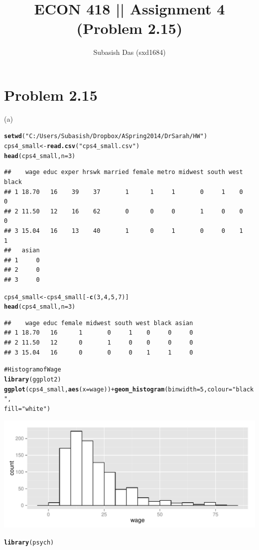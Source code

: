 \documentclass[a4paper]{article}\usepackage{graphicx, color}
\makeatletter
\def\maxwidth{ %
  \ifdim\Gin@nat@width>\linewidth
    \linewidth
  \else
    \Gin@nat@width
  \fi
}
\newcommand{\hlfunctioncall}[1]{\textcolor[rgb]{0.501960784313725,0,0.329411764705882}{\textbf{#1}}}%
\newcommand{\hlstring}[1]{\textcolor[rgb]{0.6,0.6,1}{#1}}%
\newcommand{\hlcomment}[1]{\textcolor[rgb]{0.180392156862745,0.6,0.341176470588235}{#1}}%
\newenvironment{kframe}{%
 \def\at@end@of@kframe{}%
 \ifinner\ifhmode%
  \def\at@end@of@kframe{\end{minipage}}%
  \begin{minipage}{\columnwidth}%
 \fi\fi%
 \def\FrameCommand##1{\hskip\@totalleftmargin \hskip-\fboxsep
 \colorbox{shadecolor}{##1}\hskip-\fboxsep
     \hskip-\linewidth \hskip-\@totalleftmargin \hskip\columnwidth}%
 \MakeFramed {\advance\hsize-\width
   \@totalleftmargin\z@ \linewidth\hsize
   \@setminipage}}%
 {\par\unskip\endMakeFramed%
 \at@end@of@kframe}
\newenvironment{knitrout}{}{} %
\makeatother
\begin{document}
\title{ECON 418 || Assignment 4 (Problem 2.15)}
\author{Subasish Das (sxd1684)}
\maketitle

\section{ Problem 2.15}

(a)

\begin{knitrout}
\color{fgcolor}\begin{kframe}
\begin{alltt}
\hlfunctioncall{setwd}(\hlstring{"C:/Users/Subasish/Dropbox/A Spring 2014/Dr Sarah/HW"})
cps4_small <- \hlfunctioncall{read.csv}(\hlstring{"cps4_small.csv"})
\hlfunctioncall{head}(cps4_small, n = 3)
\end{alltt}
\begin{verbatim}
##    wage educ exper hrswk married female metro midwest south west black
## 1 18.70   16    39    37       1      1     1       0     1    0     0
## 2 11.50   12    16    62       0      0     0       1     0    0     0
## 3 15.04   16    13    40       1      0     1       0     0    1     1
##   asian
## 1     0
## 2     0
## 3     0
\end{verbatim}
\begin{alltt}
cps4_small <- cps4_small[-\hlfunctioncall{c}(3, 4, 5, 7)]
\hlfunctioncall{head}(cps4_small, n = 3)
\end{alltt}
\begin{verbatim}
##    wage educ female midwest south west black asian
## 1 18.70   16      1       0     1    0     0     0
## 2 11.50   12      0       1     0    0     0     0
## 3 15.04   16      0       0     0    1     1     0
\end{verbatim}
\begin{alltt}

\hlcomment{# Histogram of Wage}
\hlfunctioncall{library}(ggplot2)
\hlfunctioncall{ggplot}(cps4_small, \hlfunctioncall{aes}(x = wage)) + \hlfunctioncall{geom_histogram}(binwidth = 5, colour = \hlstring{"black"}, 
    fill = \hlstring{"white"})
\end{alltt}
\end{kframe}
\includegraphics[width=\maxwidth]{figure/unnamed-chunk-1} 
\begin{kframe}\begin{alltt}
\hlfunctioncall{library}(psych)
\end{alltt}



\end{kframe}
\end{knitrout}
\end{document}
